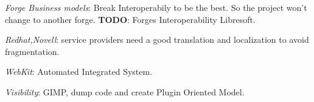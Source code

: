 \documentclass[11pt]{scrartcl}
\begin{document}
\emph{Forge Business models}: Break Interoperabily to be the best. So the project won't change to another forge. \textbf{TODO}: Forges Interoperability Libresoft.

\emph{Redhat,Novell}: service providers need a good translation and localization to avoid fragmentation.

\emph{WebKit}: Automated Integrated System.

\emph{Visibility}: GIMP, dump code and create Plugin Oriented Model.

\begin{thebibliography}{9}

    
\end{thebibliography}
\end{document}
